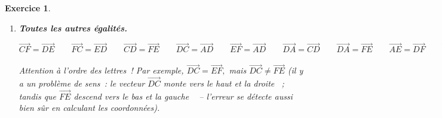 \documentclass[10pt]{article}
\newtheorem{exo}{Exercice}
\begin{document}
\begin{exo}
\begin{enumerate}
$\overrightarrow{DC}=\overrightarrow{EF}.$ En effet, ces vecteurs ont les mêmes coordonnées~:
\begin{itemize}
\item[\textbullet] $\overrightarrow{DC}\begin{pmatrix} x_C-x_D\\y_C-y_D \end{pmatrix}\qquad \overrightarrow{DC}\begin{pmatrix} 1-(-1)\\4-1 \end{pmatrix}\qquad \overrightarrow{DC}\begin{pmatrix} 2\\3 \end{pmatrix}.$
\item[\textbullet] $\overrightarrow{EF}\begin{pmatrix} x_F-x_E\\y_F-y_E \end{pmatrix}\qquad \overrightarrow{EF}\begin{pmatrix} 5-3\\4-1 \end{pmatrix}\qquad \overrightarrow{EF}\begin{pmatrix} 2\\3 \end{pmatrix}.$
\end{itemize}
\item \textbf{Toutes les autres égalités.}

$\overrightarrow{CF}=\overrightarrow{DE}\qquad \overrightarrow{FC}=\overrightarrow{ED}\qquad\overrightarrow{CD}=\overrightarrow{FE}\qquad\overrightarrow{DC}=\overrightarrow{AD}\qquad\overrightarrow{EF}=\overrightarrow{AD}\qquad\overrightarrow{DA}=\overrightarrow{CD}\qquad\overrightarrow{DA}=\overrightarrow{FE}
\qquad\overrightarrow{AE}=\overrightarrow{DF}
\qquad\overrightarrow{EA}=\overrightarrow{FD}
\qquad\overrightarrow{CE}=\overrightarrow{EB}
\qquad\overrightarrow{EC}=\overrightarrow{BE}
$

\medskip

\danger Attention à l'ordre des lettres~! Par exemple,  $\overrightarrow{DC}=\overrightarrow{EF},$ mais $\overrightarrow{DC}\not=\overrightarrow{FE}$ (il y a un problème de sens~: le vecteur $\overrightarrow{DC}$ \og monte vers le haut et la droite \fg~{}; tandis que $\overrightarrow{FE}$ \og descend vers le bas et la gauche \fg~{} -- l'erreur se détecte aussi bien sûr en calculant les coordonnées).
\end{enumerate}
\end{exo}
\end{document}
